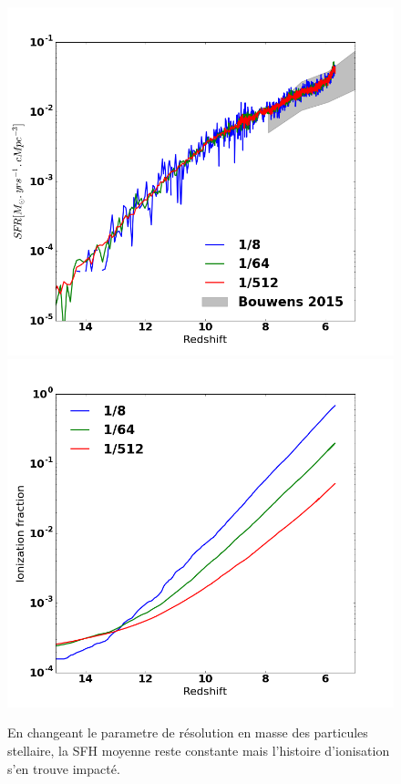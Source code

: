 \begin{figure}[bth]
        \includegraphics[width=.45\linewidth]{img/02/Mstar_SFH.png} 
        \includegraphics[width=.45\linewidth]{img/02/Mstar_xion.png} 
        \caption{
        En changeant le parametre de résolution en masse des particules stellaire, la SFH moyenne reste constante mais l'histoire d'ionisation s'en trouve impacté.
}
 		\label{fig:mstar}
\end{figure}






